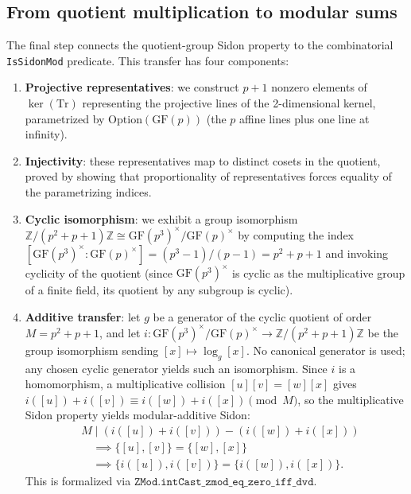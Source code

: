 \documentclass[11pt,a4paper]{article}
\begin{document}
\subsection{From quotient multiplication to modular sums}

The final step connects the quotient-group Sidon property to the combinatorial
\texttt{IsSidonMod} predicate.  This transfer has four components:

\begin{enumerate}[nosep]
  \item \textbf{Projective representatives}: we construct $p + 1$ nonzero
    elements of $\ker(\mathrm{Tr})$ representing the projective lines of the
    2-dimensional kernel, parametrized by $\mathrm{Option}(\mathrm{GF}(p))$
    (the $p$ affine lines plus one line at infinity).
  \item \textbf{Injectivity}: these representatives map to distinct cosets in
    the quotient, proved by showing that proportionality of representatives
    forces equality of the parametrizing indices.
  \item \textbf{Cyclic isomorphism}: we exhibit a group isomorphism
    $\mathbb{Z}/(p^2+p+1)\mathbb{Z} \cong \mathrm{GF}(p^3)^\times /
    \mathrm{GF}(p)^\times$ by computing the index
    $[\mathrm{GF}(p^3)^\times : \mathrm{GF}(p)^\times] =
    (p^3-1)/(p-1) = p^2+p+1$ and invoking cyclicity of the quotient
    (since $\mathrm{GF}(p^3)^\times$ is cyclic as the multiplicative group of
    a finite field, its quotient by any subgroup is cyclic).
  \item \textbf{Additive transfer}: let $g$ be a generator of the cyclic
    quotient of order $M = p^2+p+1$, and let
    $i : \mathrm{GF}(p^3)^\times/\mathrm{GF}(p)^\times \to
    \mathbb{Z}/(p^2+p+1)\mathbb{Z}$ be the group isomorphism sending
    $[x] \mapsto \log_g [x]$.  No canonical generator is used; any chosen
    cyclic generator yields such an isomorphism.  Since $i$ is a homomorphism,
    a multiplicative collision $[u][v] = [w][x]$ gives
    $i([u])+i([v]) \equiv i([w])+i([x]) \pmod{M}$,
    so the multiplicative Sidon property yields modular-additive Sidon:
    \begin{align*}
      &M \mid (i([u]){+}i([v]))-(i([w]){+}i([x])) \\
      &\quad\implies \{[u],[v]\}=\{[w],[x]\} \\
      &\quad\implies \{i([u]),i([v])\}=\{i([w]),i([x])\}.
    \end{align*}
    This is formalized via
    $\texttt{ZMod.intCast\_zmod\_eq\_zero\_iff\_dvd}$.
\end{enumerate}
\end{document}
